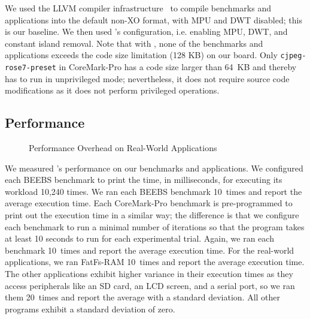 We used the LLVM compiler infrastructure~\cite{LLVM:CGO04} to compile
benchmarks and applications into the default non-XO format,
with MPU and DWT disabled; this is our baseline.  We then used
{\System}'s configuration, i.e. enabling MPU, DWT, and constant island
removal.  Note that with {\System}, none
of the benchmarks and applications exceeds the code size limitation
(128 KB) on our board.  Only {\tt cjpeg-rose7-preset} in CoreMark-Pro has a
code size larger than 64~KB and thereby has to run in unprivileged mode;
nevertheless, it does not require source code modifications as it does
not perform privileged operations.

\subsection{Performance}
\label{sec:eval:perf}



\begin{figure}[tb]
  \centering
  \caption{Performance Overhead on Real-World Applications}
  \label{fig:perf-apps}
\end{figure}

We measured {\System}'s performance on our
benchmarks and applications.  We configured each BEEBS benchmark
to print the time, in milliseconds, for executing its workload 10,240
times.  We ran each BEEBS benchmark 10~times and report the average
execution time.  Each CoreMark-Pro benchmark
is pre-programmed to print out the execution time in a similar way; the
difference is that we configure each benchmark to run a minimal number
of iterations so that the program takes at least 10 seconds to run for
each experimental trial.  Again, we ran each benchmark 10~times and
report the average execution time.
For the real-world applications, we ran FatFs-RAM 10~times
and report the average execution time.  The other
applications exhibit higher variance in their execution times as
they access peripherals like an SD card, an LCD
screen, and a serial port, so we ran them
20~times and report the average with a standard deviation.
All other programs exhibit a standard deviation of zero.

